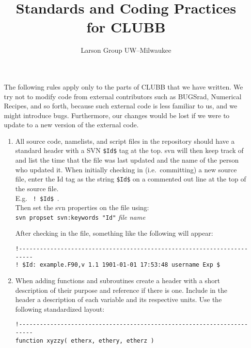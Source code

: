 \documentclass[letterpaper,12pt]{article}
\begin{document}
\title{\textbf{Standards and Coding Practices for CLUBB}}
\author{Larson Group UW--Milwaukee}

\maketitle


The following rules apply only to the parts of CLUBB that we have written.  We try not to modify
code from external contributors such as BUGSrad, 
Numerical Recipes, and so forth, because such external code is
less familiar to us, and we might introduce bugs.  Furthermore, our changes would be lost if
we were to update to a new version of the external code.
\newline


\begin{enumerate}
\item All source code, namelists, and script files in the repository should 
have a standard header with a SVN \texttt{\$Id\$} tag at the top.  svn will then
keep track of and list the time that the file was last updated and the name of
the person who updated it.  
\newline
When initially checking in (i.e.~committing) a new source file, enter the Id tag as 
the string \texttt{\$Id\$} on a commented out line at the top of the 
source file. \\
E.g. \verb| ! $Id$ |. \\
Then set the svn properties on the file using: \\
\verb|svn propset svn:keywords "Id"| \textsl{file name}

\bigskip

After checking in the file, something like the following will appear:
\begin{verbatim}
!-----------------------------------------------------------------------
! $Id: example.F90,v 1.1 1901-01-01 17:53:48 username Exp $

\end{verbatim}

\item When adding functions and subroutines create a header with a short 
description of their purpose and reference if there is one.  Include 
in the header a description of 
each variable and its respective units.  Use the following standardized
layout: 

\begin{verbatim}
!-----------------------------------------------------------------------
function xyzzy( etherx, ethery, etherz )


\end{verbatim}
\end{enumerate}
\end{document}
